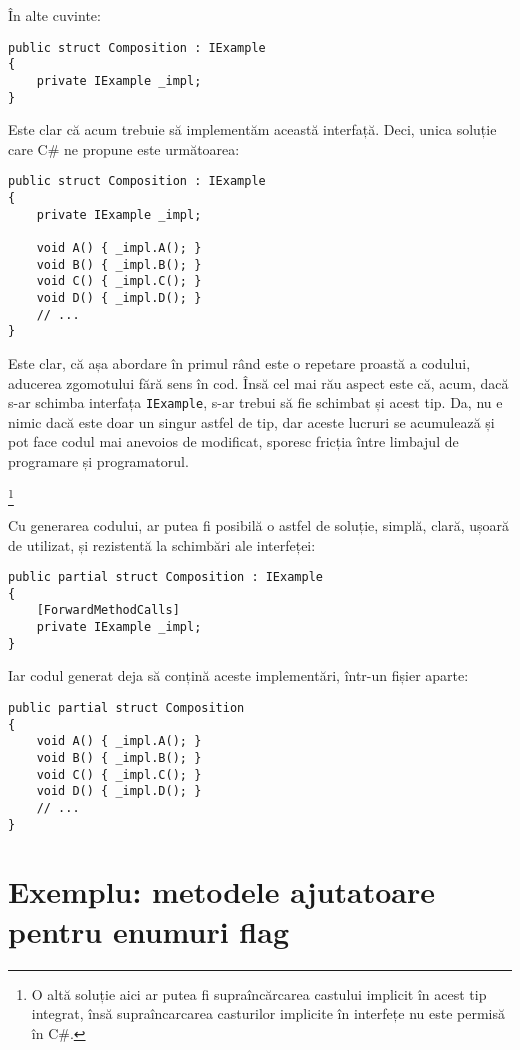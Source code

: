\documentclass[a4paper,12pt]{report}
\begin{document}
În alte cuvinte:

\begin{verbatim}
public struct Composition : IExample
{
    private IExample _impl;
}
\end{verbatim}

Este clar că acum trebuie să implementăm această interfață.
Deci, unica soluție care C\# ne propune este următoarea:

\begin{verbatim}
public struct Composition : IExample
{
    private IExample _impl;

    void A() { _impl.A(); }
    void B() { _impl.B(); }
    void C() { _impl.C(); }
    void D() { _impl.D(); }
    // ...
}
\end{verbatim}

Este clar, că așa abordare în primul rând este o repetare proastă a codului, aducerea zgomotului fără sens în cod.
Însă cel mai rău aspect este că, acum, dacă s-ar schimba interfața \texttt{IExample}, s-ar trebui să fie schimbat și acest tip. 
Da, nu e nimic dacă este doar un singur astfel de tip, dar aceste lucruri se acumulează și pot face codul mai anevoios de modificat, sporesc fricția între limbajul de programare și programatorul.

\footnote{
  O altă soluție aici ar putea fi supraîncărcarea castului implicit în acest tip integrat,
  însă supraîncarcarea casturilor implicite în interfețe nu este permisă în C\#.
}

Cu generarea codului, ar putea fi posibilă o astfel de soluție, simplă, clară, ușoară de utilizat, și rezistentă la schimbări ale interfeței:

\begin{verbatim}
public partial struct Composition : IExample
{
    [ForwardMethodCalls]
    private IExample _impl;
}
\end{verbatim}

Iar codul generat deja să conțină aceste implementări, într-un fișier aparte:

\begin{verbatim}
public partial struct Composition
{
    void A() { _impl.A(); }
    void B() { _impl.B(); }
    void C() { _impl.C(); }
    void D() { _impl.D(); }
    // ...
}
\end{verbatim}


\section{Exemplu: metodele ajutatoare pentru enumuri flag}
\end{document}
